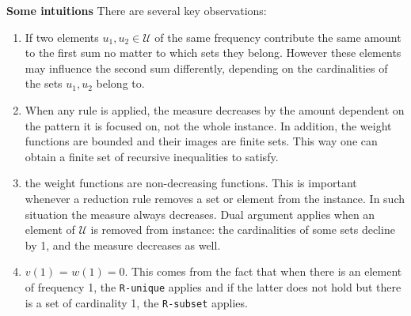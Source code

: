 \textbf{Some intuitions} There are several key observations:
\begin{enumerate}
    \item If two elements $u_1, u_2\in \mathcal{U}$ of the same frequency contribute the same amount to the first sum no matter to which sets they belong. However these elements may influence the second sum differently, depending on the cardinalities of the sets $u_1, u_2$ belong to. 
    \item When any rule is applied, the measure decreases by the amount dependent on the pattern it is focused on, not the whole instance. In addition, the weight functions are bounded and their images are finite sets. This way one can obtain a finite set of recursive inequalities to satisfy. 
    \item the weight functions are non-decreasing functions. This is important whenever a reduction rule removes a set or element from the instance. In such situation the measure always decreases. Dual argument applies when an element of $\mathcal{U}$ is removed from instance: the cardinalities of some sets decline by 1, and the measure decreases as well. 
    \item $v(1)$ = $w(1) = 0$. This comes from the fact that when there is an element of frequency 1, the \texttt{R-unique} applies and if the latter does not hold but there is a set of cardinality 1, the \texttt{R-subset} applies.
\end{enumerate}

